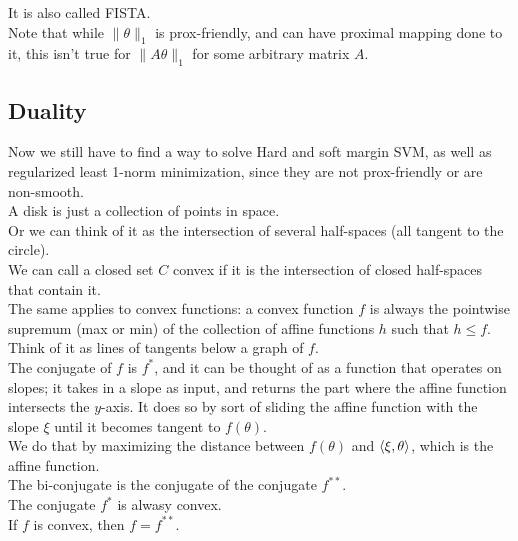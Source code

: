 \documentclass[12pt]{article}
\begin{document}
It is also called FISTA. \\

Note that while $\|\theta\|_1$
is prox-friendly, and can have proximal mapping
done to it,
this isn't true for $\|A \theta\|_1$
for some arbitrary matrix $A$. \\

\newpage

\subsection*{Duality}

Now we still have to find a way to solve
Hard and soft margin SVM, as well as regularized
least 1-norm minimization,
since they are not prox-friendly or are
non-smooth. \\

A disk is just a collection of points in space. \\

Or we can think of it as the intersection of
several half-spaces (all tangent to the circle). \\

We can call a closed set $C$
convex if it is the intersection of
closed half-spaces that contain it. \\

The same applies to convex functions:
a convex function $f$ is always the
pointwise supremum (max or min) of the
collection of affine functions $h$
such that $h \leq f$. \\
Think of it as lines of tangents below a graph
of $f$. \\

The conjugate of $f$ is $f^*$,
and it can be thought of as a function that 
operates on slopes;
it takes in a slope as input, and returns
the part where the affine function
intersects the $y$-axis.
It does so by sort of sliding the affine
function with the slope $\xi$
until it becomes tangent to $f(\theta)$. \\
We do that by maximizing the distance
between $f(\theta)$
and $\left\langle \xi, \theta \right\rangle$, 
which is the affine function. \\

The bi-conjugate is the conjugate of the
conjugate $f^{**}$. \\

The conjugate $f^*$ is alwasy convex. \\

If $f$ is convex, then $f = f^{**}$. \\
\end{document}
